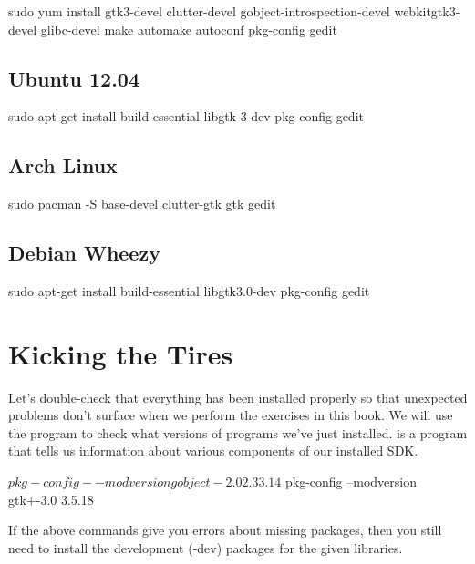 \begin{Terminal}
sudo yum install gtk3-devel clutter-devel gobject-introspection-devel webkitgtk3-devel glibc-devel make automake autoconf pkg-config gedit
\end{Terminal}


\subsection{Ubuntu 12.04}

\begin{Terminal}
sudo apt-get install build-essential libgtk-3-dev pkg-config gedit
\end{Terminal}


\subsection{Arch Linux}
\begin{Terminal}
sudo pacman -S base-devel clutter-gtk gtk gedit
\end{Terminal}

\subsection{Debian Wheezy}

\begin{Terminal}
sudo apt-get install build-essential libgtk3.0-dev pkg-config gedit
\end{Terminal}


\section{Kicking the Tires}

Let's double-check that everything has been installed properly so that 
unexpected problems don't surface when we perform the exercises in this book.
We will use the  program to check what versions of programs
we've just installed.  is a program that tells us information
about various components of our installed SDK.

\begin{Terminal}
$ pkg-config --modversion gobject-2.0
2.33.14

$ pkg-config --modversion gtk+-3.0
3.5.18
\end{Terminal}

If the above commands give you errors about missing packages, then you still
need to install the development (-dev) packages for the given libraries.

